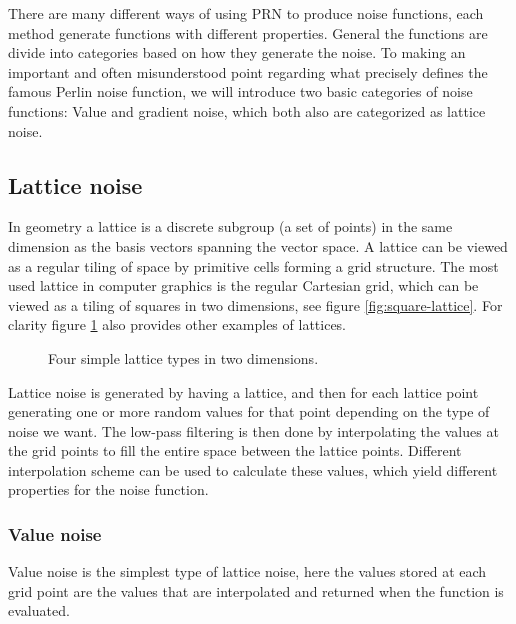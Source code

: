 There are many different ways of using PRN to produce noise functions,
each method generate functions with different properties. General the
functions are divide into categories based on how they generate the
noise. To making an important and often misunderstood point regarding
what precisely defines the famous Perlin noise function, we will
introduce two basic categories of noise functions: Value and gradient
noise, which both also are categorized as lattice noise.

\subsection{Lattice noise}
In geometry a lattice is a discrete subgroup (a set of points) in the
same dimension as the basis vectors spanning the vector space. A
lattice can be viewed as a regular tiling of space by primitive cells
forming a grid structure. The most used lattice in computer graphics is the
regular Cartesian grid, which can be viewed as a tiling of
squares in two dimensions, see figure \ref{fig:square-lattice}. For
clarity figure \ref{fig:lattices} also provides other examples of
lattices.

\begin{figure}[!h]
  \centering
  \hspace{4mm}
  \hspace{4mm}
  \hspace{4mm}
  \caption{Four simple lattice types in two dimensions.}
  \label{fig:lattices}
\end{figure}

Lattice noise is generated by having a lattice, and then for each
lattice point generating one or more random values for that point
depending on the type of noise we want.
%
The low-pass filtering is then done by interpolating the values at the
grid points to fill the entire space between the lattice
points. Different interpolation scheme can be used to calculate these
values, which yield different properties for the noise function.

\subsubsection{Value noise}
Value noise is the simplest type of lattice noise, here the values
stored at each grid point are the values that are interpolated and
returned when the function is evaluated.

